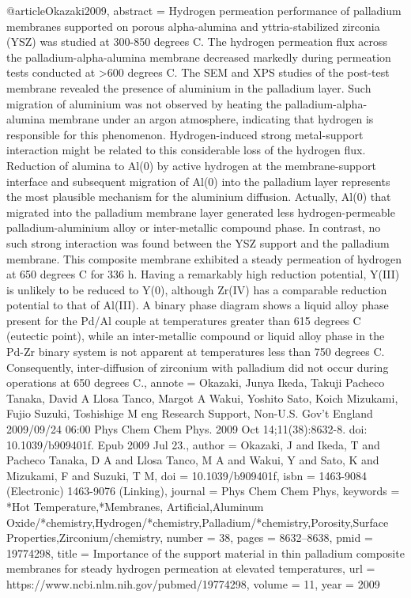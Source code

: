 @article{Okazaki2009,
abstract = {Hydrogen permeation performance of palladium membranes supported on porous alpha-alumina and yttria-stabilized zirconia (YSZ) was studied at 300-850 degrees C. The hydrogen permeation flux across the palladium-alpha-alumina membrane decreased markedly during permeation tests conducted at {\textgreater}600 degrees C. The SEM and XPS studies of the post-test membrane revealed the presence of aluminium in the palladium layer. Such migration of aluminium was not observed by heating the palladium-alpha-alumina membrane under an argon atmosphere, indicating that hydrogen is responsible for this phenomenon. Hydrogen-induced strong metal-support interaction might be related to this considerable loss of the hydrogen flux. Reduction of alumina to Al(0) by active hydrogen at the membrane-support interface and subsequent migration of Al(0) into the palladium layer represents the most plausible mechanism for the aluminium diffusion. Actually, Al(0) that migrated into the palladium membrane layer generated less hydrogen-permeable palladium-aluminium alloy or inter-metallic compound phase. In contrast, no such strong interaction was found between the YSZ support and the palladium membrane. This composite membrane exhibited a steady permeation of hydrogen at 650 degrees C for 336 h. Having a remarkably high reduction potential, Y(III) is unlikely to be reduced to Y(0), although Zr(IV) has a comparable reduction potential to that of Al(III). A binary phase diagram shows a liquid alloy phase present for the Pd/Al couple at temperatures greater than 615 degrees C (eutectic point), while an inter-metallic compound or liquid alloy phase in the Pd-Zr binary system is not apparent at temperatures less than 750 degrees C. Consequently, inter-diffusion of zirconium with palladium did not occur during operations at 650 degrees C.},
annote = {Okazaki, Junya
Ikeda, Takuji
Pacheco Tanaka, David A
Llosa Tanco, Margot A
Wakui, Yoshito
Sato, Koich
Mizukami, Fujio
Suzuki, Toshishige M
eng
Research Support, Non-U.S. Gov't
England
2009/09/24 06:00
Phys Chem Chem Phys. 2009 Oct 14;11(38):8632-8. doi: 10.1039/b909401f. Epub 2009 Jul 23.},
author = {Okazaki, J and Ikeda, T and {Pacheco Tanaka}, D A and {Llosa Tanco}, M A and Wakui, Y and Sato, K and Mizukami, F and Suzuki, T M},
doi = {10.1039/b909401f},
isbn = {1463-9084 (Electronic)
1463-9076 (Linking)},
journal = {Phys Chem Chem Phys},
keywords = {*Hot Temperature,*Membranes, Artificial,Aluminum Oxide/*chemistry,Hydrogen/*chemistry,Palladium/*chemistry,Porosity,Surface Properties,Zirconium/chemistry},
number = {38},
pages = {8632--8638},
pmid = {19774298},
title = {{Importance of the support material in thin palladium composite membranes for steady hydrogen permeation at elevated temperatures}},
url = {https://www.ncbi.nlm.nih.gov/pubmed/19774298},
volume = {11},
year = {2009}
}
